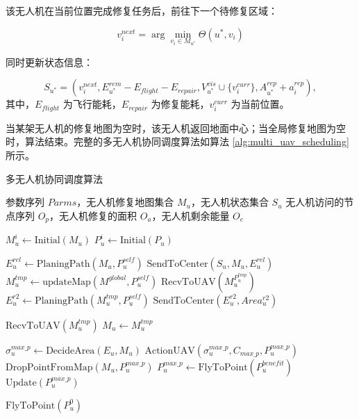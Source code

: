 \documentclass[AutoFakeBold]{LZUThesis}
\begin{document}
该无人机在当前位置完成修复任务后，前往下一个待修复区域：

\begin{equation}
	v_i^{next} = \arg\min_{v_i \in M_{u^*}} \Theta(u^*,v_i)
\end{equation}

同时更新状态信息：

\begin{equation}
	S_{u^*} = (v_i^{next}, E_{u^*}^{rem} - E_{flight} - E_{repair}, V_{u^*}^{vis} \cup \{v_i^{curr}\}, A_{u^*}^{rep} + a_i^{rep}),
\end{equation}
其中，$E_{flight}$ 为飞行能耗，$E_{repair}$ 为修复能耗，$v_i^{curr}$ 为当前位置。

当某架无人机的修复地图为空时，该无人机返回地面中心；当全局修复地图为空时，算法结束。完整的多无人机协同调度算法如算法 \ref{alg:multi_uav_scheduling} 所示。

\begin{algorithm}[H]
	\caption{多无人机协同调度算法}
	\label{alg:multi_uav_scheduling}
	\begin{algorithmic}[1]
		\Require 参数序列 $Parms$，无人机修复地图集合 $M_u$，无人机状态集合 $S_u$
		\Ensure 无人机访问的节点序列 $O_p$，无人机修复的面积 $O_a$，无人机剩余能量 $O_e$

		\State $M_u^i \gets \text{Initial}(M_u)$ 
		\State $P_u^i \gets \text{Initial}(P_u)$ 

		\State $E_u^{rel} \gets \text{PlaningPath}(M_u, P_u^{self})$ 
		\State $\text{SendToCenter}(S_u, M_u, E_u^{rel})$ 
		\State $M_u^{tmp} \gets \text{updateMap}(M^{global}, P_u^{self})$ 
		\State $\text{RecvToUAV}(M_u^{P_u^{tmp}})$ 
		\State $E_u^{r2} \gets \text{PlaningPath}(M_u^{tmp}, P_u^{self})$ 
		\State $\text{SendToCenter}(E_u^{r2}, Area_u^{r2})$ 

		\State $\text{RecvToUAV}(M_u^{tmp})$ 
		\State $M_u \gets M_u^{tmp}$
		\EndIf

		\State $\sigma_u^{max\_p} \gets \text{DecideArea}(E_u, M_u)$ 
		\State $\text{ActionUAV}(\sigma_u^{max\_p}, C_{max\_p}, P_u^{max\_p})$ 
		\State $\text{DropPointFromMap}(M_u, P_u^{max\_p})$
		\State $P_u^{max\_p} \gets \text{FlyToPoint}(P_u^{benefit})$ 
		\State $\text{Update}(P_u^{max\_p})$ 
		\EndWhile

		\State $\text{FlyToPoint}(P_u^0)$ 
	\end{algorithmic}
\end{algorithm}
\end{document}

